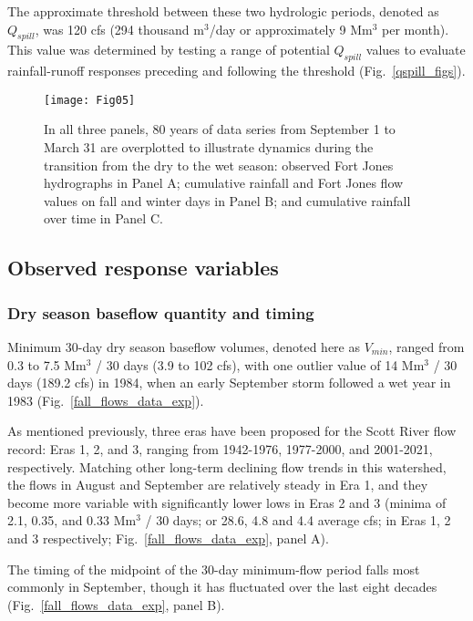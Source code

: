 \documentclass[hess, manuscript]{copernicus}
\begin{document}
The approximate threshold between these two hydrologic periods, denoted
as $Q_{spill}$, was 120 cfs (294 thousand m$^\mathrm{3}$/day or
approximately 9 Mm$^\mathrm{3}$ per month). This value was
determined by testing a range of potential $Q_{spill}$ values to
evaluate rainfall-runoff responses preceding and following the threshold
(Fig.~\ref{qspill_figs}).

\begin{figure}
\texttt{[image: Fig05]} \caption{\label{fig:time_v_fall_rains_v_flow_fig} In all three panels, 80 years of data series from September 1 to March 31 are overplotted to illustrate dynamics during the transition from the dry to the wet season: observed Fort Jones hydrographs in Panel A; cumulative rainfall and Fort Jones flow values on fall and winter days in Panel B; and cumulative rainfall over time in Panel C.}\label{fig:time_v_fall_rains_v_flow_fig}
\end{figure}

\subsection{Observed response variables}

\subsubsection{Dry season baseflow quantity and timing}

Minimum 30-day dry season baseflow volumes, denoted here as $V_{min}$,
ranged from 0.3 to 7.5 Mm$^\mathrm{3}$ / 30 days (3.9 to 102 cfs),
with one outlier value of 14 Mm$^\mathrm{3}$ / 30 days (189.2 cfs)
in 1984, when an early September storm followed a wet year in 1983
(Fig.~\ref{fall_flows_data_exp}).

As mentioned previously, three eras have been proposed for the Scott
River flow record: Eras 1, 2, and 3, ranging from 1942-1976, 1977-2000,
and 2001-2021, respectively. Matching other long-term declining flow
trends in this watershed, the flows in August and September are
relatively steady in Era 1, and they become more variable with
significantly lower lows in Eras 2 and 3 (minima of 2.1, 0.35, and 0.33
Mm$^\mathrm{3}$ / 30 days; or 28.6, 4.8 and 4.4 average cfs; in
Eras 1, 2 and 3 respectively; Fig.~\ref{fall_flows_data_exp}, panel
A).

The timing of the midpoint of the 30-day minimum-flow period falls most
commonly in September, though it has fluctuated over the last eight
decades (Fig.~\ref{fall_flows_data_exp}, panel B).
\end{document}

